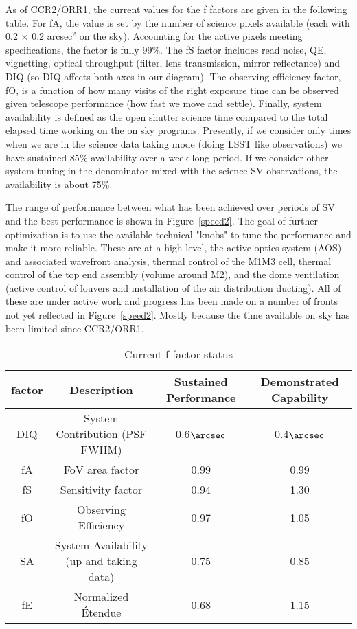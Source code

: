 As of CCR2/ORR1, the current values for the f factors are given in the following table. For fA, the value is set by the number of science pixels available (each with 0.2 $\times$ 0.2 arcsec$^2$ on the sky). Accounting for the active pixels meeting specifications, the factor is fully 99$\%$. The fS factor includes read noise, QE, vignetting, optical throughput (filter, lens transmission, mirror reflectance) and DIQ (so DIQ affects both axes in our diagram). The observing efficiency factor, fO, is a function of how many visits of the right exposure time can be observed given telescope performance (how fast we move and settle). Finally, system availability is defined as the open shutter science time compared to the total elapsed time working on the on sky programs. Presently, if we consider only times when we are in the science data taking mode (doing LSST like observations) we have sustained 85$\%$ availability over a week long period. If we consider other system tuning in the denominator mixed with the science SV observations, the availability is about 75$\%$. 

The range of performance between what has been achieved over periods of SV and the best performance is shown in Figure~\ref{speed2}. The goal of further optimization is to use the available technical "knobs" to tune the performance and make it more reliable. These are at a high level, the active optics system (AOS) and associated wavefront analysis, thermal control of the M1M3 cell, thermal control of the top end assembly (volume around M2), and the dome ventilation (active control of louvers and installation of the air distribution ducting). All of these are under active work and progress has been made on a number of fronts not yet reflected in Figure~\ref{speed2}. Mostly because the time available on sky has been limited since CCR2/ORR1. 

\begin{table}[]
\renewcommand{\arraystretch}{2}
\small
\centering
\caption{Current f factor status}\label{tab:factors}
\begin{tabular}{cccc}
\hline
factor & Description& Sustained Performance & Demonstrated Capability \\
\hline \hline
DIQ & System Contribution (PSF FWHM)  & 0.6$\arcsec$ & 0.4$\arcsec$ \\
fA & FoV area factor & 0.99 & 0.99 \\
fS & Sensitivity factor & 0.94 & 1.30 \\
fO & Observing Efficiency & 0.97 & 1.05 \\
SA & System Availability (up and taking data) & 0.75 & 0.85 \\
fE & Normalized \'{E}tendue & 0.68 & 1.15 \\

\hline
\end{tabular}
\end{table}

